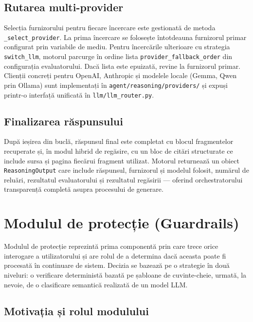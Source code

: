 \documentclass[12pt, a4paper, oneside, romanian]{teza-upb}
\begin{document}
\subsection{Rutarea multi-provider}

Selecția furnizorului pentru fiecare încercare este gestionată de metoda \texttt{\_select\_provider}. La prima încercare se folosește întotdeauna furnizorul primar configurat prin variabile de mediu. Pentru încercările ulterioare cu strategia \texttt{switch\_llm}, motorul parcurge în ordine lista \texttt{provider\_fallback\_order} din configurația evaluatorului. Dacă lista este epuizată, revine la furnizorul primar. Clienții concreți pentru OpenAI, Anthropic și modelele locale (Gemma, Qwen prin Ollama) sunt implementați în \texttt{agent/reasoning/providers/} și expuși printr-o interfață unificată în \texttt{llm/llm\_router.py}.

\subsection{Finalizarea răspunsului}

După ieșirea din buclă, răspunsul final este completat cu blocul fragmentelor recuperate și, în modul hibrid de regăsire, cu un bloc de citări structurate ce include sursa și pagina fiecărui fragment utilizat. Motorul returnează un obiect \texttt{ReasoningOutput} care include răspunsul, furnizorul și modelul folosit, numărul de reluări, rezultatul evaluatorului și rezultatul regăsirii — oferind orchestratorului transparență completă asupra procesului de generare.




\section{Modulul de protecție (Guardrails)}

Modulul de protecție reprezintă prima componentă prin care trece orice interogare a utilizatorului și are rolul de a determina dacă aceasta poate fi procesată în continuare de sistem. Decizia se bazează pe o strategie în două niveluri: o verificare deterministă bazată pe șabloane de cuvinte-cheie, urmată, la nevoie, de o clasificare semantică realizată de un model LLM.

\subsection{Motivația și rolul modulului}
\end{document}
